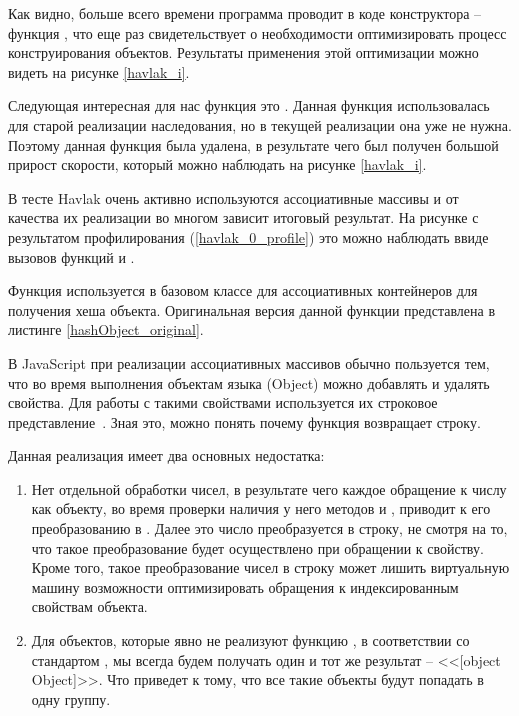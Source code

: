 \newpage
Как видно, больше всего времени программа проводит в коде конструктора -- функция , что еще раз свидетельствует о необходимости оптимизировать процесс конструирования объектов. Результаты применения этой оптимизации можно видеть на рисунке \ref{havlak_i}.

Следующая интересная для нас функция это . Данная функция использовалась для старой реализации наследования, но в текущей реализации она уже не нужна. Поэтому данная функция была удалена, в результате чего был получен большой прирост скорости, который можно наблюдать на рисунке \ref{havlak_i}.

В тесте Havlak очень активно используются ассоциативные массивы и от качества их реализации во многом зависит итоговый результат.
На рисунке с результатом профилирования (\ref{havlak_0_profile}) это можно наблюдать ввиде вызовов функций  и .

Функция  используется в базовом классе для ассоциативных контейнеров  для получения хеша объекта. Оригинальная версия данной функции представлена в листинге \ref{hashObject_original}.

В JavaScript при реализации ассоциативных массивов обычно пользуется тем, что во время выполнения объектам языка (Object) можно добавлять и удалять свойства. Для работы с такими свойствами используется их строковое представление~\cite{EffJS}. Зная это, можно понять почему функция  возвращает строку.

Данная реализация имеет два основных недостатка:
\begin{enumerate}
\item Нет отдельной обработки чисел, в результате чего каждое обращение к числу как объекту, во время проверки наличия у него методов  и , приводит к его преобразованию в . Далее это число преобразуется в строку, не смотря на то, что такое преобразование будет осуществлено при обращении к свойству.
Кроме того, такое преобразование чисел в строку может лишить виртуальную машину возможности оптимизировать обращения к индексированным свойствам объекта.

\item Для объектов, которые явно не реализуют функцию , в соответствии со стандартом \cite{ES5}, мы всегда будем получать один и тот же результат -- <<[object Object]>>. Что приведет к тому, что все такие объекты будут попадать в одну группу.
\end{enumerate}

